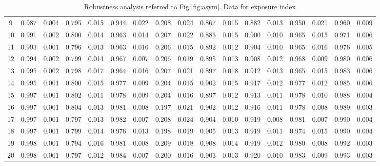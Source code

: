 \documentclass{article}
\begin{document}
\begin{table}[H]
{\begin{tabular}{|c|c|c|c|c|c|c|c|c|c|c|c|c|c|c|c|c|}
     9 & 0.987 & 0.004 & 0.795 & 0.015 & 0.944 & 0.022 & 0.208 & 0.024 & 0.867 & 0.015 & 0.882 & 0.013 & 0.950 & 0.021 & 0.960 & 0.009 \\ 
    10 & 0.991 & 0.002 & 0.800 & 0.014 & 0.963 & 0.014 & 0.207 & 0.022 & 0.883 & 0.015 & 0.900 & 0.010 & 0.965 & 0.015 & 0.971 & 0.006 \\ 
    11 & 0.993 & 0.001 & 0.796 & 0.013 & 0.963 & 0.016 & 0.206 & 0.015 & 0.892 & 0.012 & 0.904 & 0.010 & 0.965 & 0.016 & 0.976 & 0.005 \\ 
    12 & 0.994 & 0.002 & 0.799 & 0.014 & 0.967 & 0.007 & 0.206 & 0.019 & 0.895 & 0.013 & 0.908 & 0.012 & 0.968 & 0.009 & 0.980 & 0.006 \\ 
    13 & 0.995 & 0.002 & 0.798 & 0.017 & 0.964 & 0.016 & 0.207 & 0.021 & 0.897 & 0.018 & 0.912 & 0.013 & 0.965 & 0.015 & 0.983 & 0.006 \\ 
    14 & 0.995 & 0.001 & 0.800 & 0.015 & 0.977 & 0.009 & 0.204 & 0.015 & 0.902 & 0.015 & 0.917 & 0.012 & 0.977 & 0.012 & 0.985 & 0.006 \\ 
    15 & 0.997 & 0.001 & 0.802 & 0.011 & 0.978 & 0.009 & 0.204 & 0.016 & 0.897 & 0.012 & 0.913 & 0.011 & 0.978 & 0.010 & 0.988 & 0.004 \\ 
    16 & 0.997 & 0.001 & 0.804 & 0.013 & 0.981 & 0.008 & 0.197 & 0.021 & 0.902 & 0.012 & 0.916 & 0.011 & 0.978 & 0.008 & 0.989 & 0.003 \\ 
    17 & 0.997 & 0.001 & 0.797 & 0.013 & 0.982 & 0.007 & 0.208 & 0.024 & 0.904 & 0.010 & 0.919 & 0.008 & 0.981 & 0.007 & 0.990 & 0.004 \\ 
    18 & 0.997 & 0.001 & 0.799 & 0.014 & 0.976 & 0.013 & 0.198 & 0.019 & 0.905 & 0.013 & 0.919 & 0.011 & 0.974 & 0.015 & 0.990 & 0.004 \\ 
    19 & 0.998 & 0.001 & 0.794 & 0.016 & 0.981 & 0.008 & 0.209 & 0.018 & 0.908 & 0.014 & 0.919 & 0.012 & 0.980 & 0.008 & 0.992 & 0.003 \\ 
    20 & 0.998 & 0.001 & 0.797 & 0.012 & 0.984 & 0.007 & 0.200 & 0.016 & 0.903 & 0.013 & 0.920 & 0.010 & 0.983 & 0.009 & 0.993 & 0.003 \\ 
   \hline
\end{tabular}
}

\caption{Robustness analysis referred to Fig:\ref{fig:asym}. Data for exposure index}
\label{tab:asym_expo}
\end{table}
\end{document}
